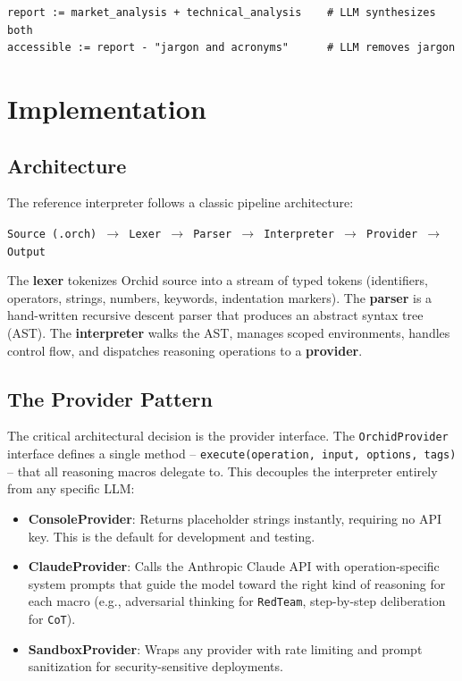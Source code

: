 \documentclass[11pt,a4paper]{article}
\begin{document}
\begin{lstlisting}[language=orchid]
report := market_analysis + technical_analysis    # LLM synthesizes both
accessible := report - "jargon and acronyms"      # LLM removes jargon
\end{lstlisting}

\section{Implementation}

\subsection{Architecture}

The reference interpreter follows a classic pipeline architecture:

\begin{center}
\texttt{Source (.orch) $\rightarrow$ Lexer $\rightarrow$ Parser $\rightarrow$ Interpreter $\rightarrow$ Provider $\rightarrow$ Output}
\end{center}

The \textbf{lexer} tokenizes Orchid source into a stream of typed tokens (identifiers, operators, strings, numbers, keywords, indentation markers). The \textbf{parser} is a hand-written recursive descent parser that produces an abstract syntax tree (AST). The \textbf{interpreter} walks the AST, manages scoped environments, handles control flow, and dispatches reasoning operations to a \textbf{provider}.

\subsection{The Provider Pattern}

The critical architectural decision is the provider interface. The \texttt{OrchidProvider} interface defines a single method -- \texttt{execute(operation, input, options, tags)} -- that all reasoning macros delegate to. This decouples the interpreter entirely from any specific LLM:

\begin{itemize}[leftmargin=*]
  \item \textbf{ConsoleProvider}: Returns placeholder strings instantly, requiring no API key. This is the default for development and testing.
  \item \textbf{ClaudeProvider}: Calls the Anthropic Claude API with operation-specific system prompts that guide the model toward the right kind of reasoning for each macro (e.g., adversarial thinking for \texttt{RedTeam}, step-by-step deliberation for \texttt{CoT}).
  \item \textbf{SandboxProvider}: Wraps any provider with rate limiting and prompt sanitization for security-sensitive deployments.
\end{itemize}
\end{document}
